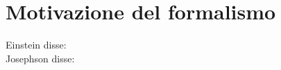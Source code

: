 \documentclass[../main/main.tex]{subfiles}
\begin{document}
\section{Motivazione del formalismo}

Einstein disse: \cite{einstein}\\
Josephson disse: \cite{RevModPhys.36.216}\\

\lipsum
\end{document}
